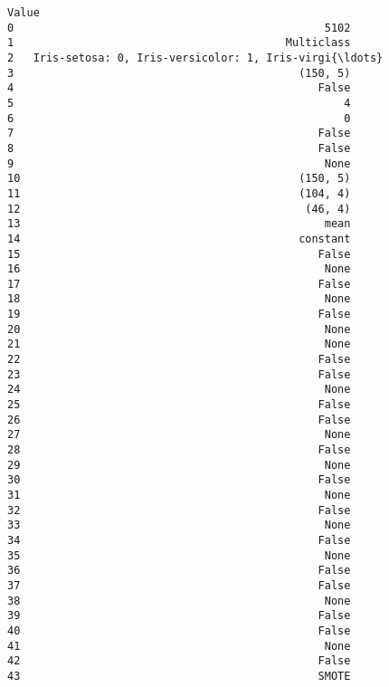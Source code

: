 \documentclass[11pt]{article}
\begin{document}
\begin{Verbatim}[commandchars=\\\{\}]
                                                Value
0                                                5102
1                                          Multiclass
2   Iris-setosa: 0, Iris-versicolor: 1, Iris-virgi{\ldots}
3                                            (150, 5)
4                                               False
5                                                   4
6                                                   0
7                                               False
8                                               False
9                                                None
10                                           (150, 5)
11                                           (104, 4)
12                                            (46, 4)
13                                               mean
14                                           constant
15                                              False
16                                               None
17                                              False
18                                               None
19                                              False
20                                               None
21                                               None
22                                              False
23                                              False
24                                               None
25                                              False
26                                              False
27                                               None
28                                              False
29                                               None
30                                              False
31                                               None
32                                              False
33                                               None
34                                              False
35                                               None
36                                              False
37                                              False
38                                               None
39                                              False
40                                              False
41                                               None
42                                              False
43                                              SMOTE
    \end{Verbatim}
\end{document}
